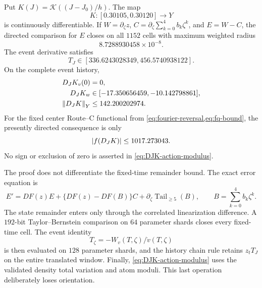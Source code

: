 \begin{theorem}
\label{thm:event-first-derivative}
Put \(K(J)=\mathcal K((J-J_0)/h)\).  The map
\[
 K:[0.30105,0.30120]\longrightarrow Y
\]
is continuously differentiable.  If \(W=\partial_\zeta z\),
\(C=\partial_\zeta\sum_{k=0}^4b_k\zeta^k\), and \(E=W-C\), the directed
comparison for \(E\) closes on all \(1152\) cells with maximum weighted
radius
\begin{equation}
 8.7288930458\times10^{-8}.                            \label{eq:stage5d-radius}
\end{equation}
The event derivative satisfies
\begin{equation}
 T_J\in[336.6243028349,456.5740938122].                \label{eq:TJ-bound}
\end{equation}
On the complete event history,
\begin{align}
 D_JK_v(0)&=0,\notag\\
 D_JK_w&\in[-17.350656459,-10.142798861],\notag\\
 \left\lVert D_JK\right\rVert_Y&\le142.200202974.                       \label{eq:DJK-bound}
\end{align}
For the fixed center Route--C functional from
\cref{eq:fourier-reversal,eq:fq-bound}, the presently directed consequence
is only
\begin{equation}
 \left\lvert f(D_JK)\right\rvert\le1017.273043.                          \label{eq:DJK-action-modulus}
\end{equation}
No sign or exclusion of zero is asserted in
\cref{eq:DJK-action-modulus}.
\end{theorem}

The proof does not differentiate the fixed-time remainder bound.  The exact
error equation is
\[
 E'=DF(z)E+\{DF(z)-DF(B)\}C
       +\partial_\zeta\operatorname{Tail}_{\ge5}(B),
 \qquad B=\sum_{k=0}^4b_k\zeta^k.
\]
The state remainder enters only through the correlated linearization
difference.  A \(192\)-bit Taylor--Bernstein comparison on \(64\) parameter
shards closes every fixed-time cell.  The event identity
\[
 T_\zeta=-W_v(T,\zeta)/\dot v(T,\zeta)
\]
is then evaluated on \(128\) parameter shards, and the history chain rule
retains \(z_tT_J\) on the entire translated window.  Finally,
\cref{eq:DJK-action-modulus} uses the validated density total variation and
atom moduli.  This last operation deliberately loses orientation.

